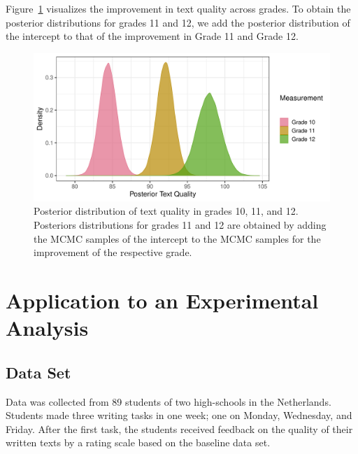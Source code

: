 \documentclass[a4paper]{article}
\newcommand{\DON}	[1] 	{\todo[linecolor=gray, backgroundcolor=white]	{Don: 	{#1}}}
\begin{document}
Figure~\ref{fig:baselinePosteriorTextQuality} visualizes the improvement in text quality across grades. To obtain the posterior distributions for grades 11 and 12, we add the posterior distribution of the intercept to that of the improvement in Grade 11 and Grade 12. 
\begin{figure}[!ht]
	\includegraphics[width=\textwidth]{figures/baselinePosteriorTextQualityOverGrades.pdf}
	\caption{Posterior distribution of text quality in grades 10, 11, and 12. Posteriors distributions for grades 11 and 12 are obtained by adding the MCMC samples of the intercept to the MCMC samples for the improvement of the respective grade.}
	\label{fig:baselinePosteriorTextQuality}
\end{figure}

\section*{Application to an Experimental Analysis}

\subsection*{Data Set}
Data was collected from 89 students of two high-schools in the Netherlands. Students made three writing tasks in one week; one on Monday, Wednesday, and Friday. After the first task, the students received feedback on the quality of their written texts by a rating scale based on the baseline data set.
\DON{Aanvullen aub!}
\end{document}
